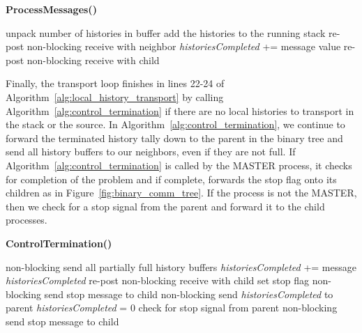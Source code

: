 \documentclass[letterpaper,11pt]{article}
\begin{document}
\begin{algorithm}[h!]
  \caption{\textbf{ProcessMessages()}}
  \label{alg:process_messages}
  \begin{algorithmic}[1]
    \State unpack number of histories in buffer
    \State add the histories to the running stack
    \State re-post non-blocking receive with neighbor
    \EndFor
    \State \textit{historiesCompleted} += message value
    \State re-post non-blocking receive with child
    \EndFor
  \end{algorithmic}
\end{algorithm}

Finally, the transport loop finishes in lines 22-24 of
Algorithm~\ref{alg:local_history_transport} by calling
Algorithm~\ref{alg:control_termination} if there are no local
histories to transport in the stack or the source. In
Algorithm~\ref{alg:control_termination}, we continue to forward the
terminated history tally down to the parent in the binary tree and
send all history buffers to our neighbors, even if they are not
full. If Algorithm~\ref{alg:control_termination} is called by the
MASTER process, it checks for completion of the problem and if
complete, forwards the stop flag onto its children as in
Figure~\ref{fig:binary_comm_tree}. If the process is not the MASTER,
then we check for a stop signal from the parent and forward it to the
child processes.

\begin{algorithm}[h!]
  \caption{\textbf{ControlTermination()}}
  \label{alg:control_termination}
  \begin{algorithmic}[1]
    \State non-blocking send all partially full history buffers
     \State
    \textit{historiesCompleted} += message \textit{historiesCompleted}
    \State re-post non-blocking receive with child \EndFor {}  \State set stop flag  \State
    non-blocking send stop message to child \EndFor \EndIf \Else \State
    non-blocking send \textit{historiesCompleted} to parent \State
    \textit{historiesCompleted} = 0 \State check for stop signal from
    parent   \State
    non-blocking send stop message to child \EndFor \EndIf \EndIf
  \end{algorithmic}
\end{algorithm}
\end{document}

